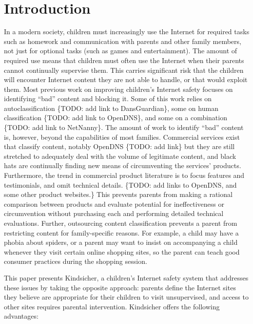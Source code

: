 
\section{Introduction}

In a modern society, children must increasingly use the Internet for required
tasks such as homework and communication with parents and other family
members, not just for optional tasks (such as games and entertainment). 
%
The amount of required use means that children must often use the Internet
when their parents cannot continually supervise them. 
%
This carries significant risk that the children will encounter Internet
content they are not able to handle, or that would exploit them. 
%
Most previous work on improving children's Internet safety focuses on
identifying ``bad'' content and blocking it. Some of this work relies
on autoclassification \{TODO: add link to DansGuardian\}, some on
human classification \{TODO: add link to OpenDNS\}, and some on a
combination \{TODO: add link to NetNanny\}.
%
The amount of work to identify ``bad'' content is, however, beyond the
capabilities of most families.
%
Commercial services exist that classify content, notably OpenDNS
\{TODO: add link\} but they are still stretched to adequately deal
with the volume of legitimate content, and black hats are continually
finding new means of circumventing the services' products.  
%
Furthermore, the trend in commercial product literature is to focus
features and testimonials, and omit technical details.  \{TODO: add links to OpenDNS, and some other product websites.\}
%
This prevents parents from making a rational comparison between
products and evaluate potential for ineffectiveness or circumvention
without purchasing each and performing detailed technical evaluations.
%
Further, outsourcing content classification prevents a parent from restricting
content for family-specific reasons. 
%
For example, a child may have a phobia about spiders, or a parent may want to
insist on accompanying a child whenever they visit certain online shopping
sites, so the parent can teach good consumer practices during the shopping
session. 

This paper presents Kindsicher, a children's Internet safety system
that addresses these issues by taking the opposite approach: parents
define the Internet sites they believe are appropriate for their
children to visit unsupervised, and access to other sites requires
parental intervention.
%
Kindsicher offers the following advantages:

